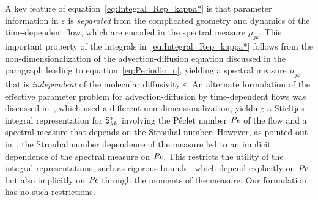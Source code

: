 \documentclass[amsa]{ipart}
\begin{document}
A key feature of equation~\eqref{eq:Integral_Rep_kappa*} is that
parameter information in $\varepsilon$ is \emph{separated} from the complicated
geometry and dynamics of the time-dependent flow, which are encoded
in the spectral measure $\mu_{jk}$. This important property of the integrals
in~\eqref{eq:Integral_Rep_kappa*} follows from the
non-dimensionalization of the advection-diffusion equation discussed
in the paragraph leading 
to equation~\eqref{eq:Periodic_u}, yielding a spectral measure $\mu_{jk}$ that
is \emph{independent} of the molecular diffusivity $\varepsilon$. An alternate
formulation of the effective parameter problem for advection-diffusion
by time-dependent flows was discussed in~\cite{Avellaneda:PRE:3249},
which used a different 
non-dimensionalization, yielding a Stieltjes integral representation
for $\mathsf{S}^*_{kk}$ involving the P{\'e}clet number $\mbox{\textit{Pe}}$ of the flow and a
spectral measure that depends on the Strouhal number. However, as pointed
out in~\cite{Bonn:McLaughlin:JFM:2001:345}, the Strouhal number
dependence of the measure led to an implicit
dependence of the spectral measure on $\mbox{\textit{Pe}}$. This restricts the
utility of the integral representations, such as rigorous
bounds~\cite{Baker:1996:Book:Pade,Golden:CMP-473} which depend
explicitly on $\mbox{\textit{Pe}}$ but also implicitly on $\mbox{\textit{Pe}}$ through the
moments of the measure. Our formulation has no such restrictions. 
\end{document}
